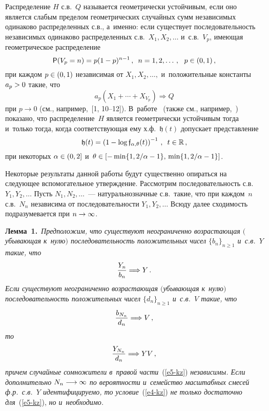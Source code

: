 \begin{multicols}{2}
Распределение $H$ с.в.~$Q$ называется геометрически устойчивым,
если оно является слабым пределом геометрических случайных сумм
независимых одинаково распределенных с.в., а~именно: если существует
последовательность независимых одинаково распределенных с.в.\
$X_1,X_2,\ldots$ и~с.в.~$V_p$, имеющая геометрическое распределение
\begin{equation*}
{\sf P}(V_p=n)=p(1-p)^{n-1}\,,\enskip n=1,2,\ldots\,,\ \  p\in(0,1)\,,
\end{equation*}
при каждом $p\hm\in(0,1)$ независимая от $X_1,X_2,\ldots,$ 
и~положительные константы~$a_p\hm>0$ такие, что
$$
a_p\left(X_1+\cdots+X_{V_p}\right)\Longrightarrow Q
$$
при $p\to 0$ (см., например,~[1, 10--12]). 
В~работе~\cite{KlebanovManiaMelamed1984} (также см., 
например,~\cite{Rachev1991, GnedenkoKorolev1996}) показано, что распределение~$H$ 
является геометрически устойчивым тогда и~только тогда, когда
соответствующая ему х.ф.~$\mathfrak{h}(t)$ допускает представление
\begin{equation}
\mathfrak{h}(t)=\left(1-\log\mathfrak{f}_{\alpha,\theta}(t)\right)^{-1}\,,\enskip
t\in\mathbb{R}\,,
\label{e3-kz}
\end{equation}
при некоторых $\alpha\hm\in(0,2]$ 
и~$\theta\hm\in[-\min\{1,{2}/{\alpha}\hm-1\},\,\min\{1,{2}/{\alpha}\hm-1\}]$.

Некоторые результаты данной работы будут существенно опираться на
следующее вспомогательное утверждение. Рассмотрим последовательность
с.в.~$Y_1, Y_2,\ldots$ Пусть $N_1,N_2,\ldots$~---
на\-ту\-раль\-но\-знач\-ные с.в.\ такие, что при каждом~$n$ с.в.~$N_n$ 
независима от последовательности $Y_1,Y_2,\ldots$ Всюду далее
сходимость подразумевается при $n\hm\to\infty$.

\smallskip

\noindent
\textbf{Лемма~1.}\ \textit{Предположим, что существуют неограниченно
возрастающая $($убывающая к~нулю$)$ последовательность положительных
чисел $\{b_n\}_{n\geqslant1}$ и~с.в.~$Y$ такие, что}
$$
\displaystyle\frac{\displaystyle Y_n\mathstrut}{\displaystyle b_n\mathstrut}\Longrightarrow Y\,.
$$
\textit{Если существуют неограниченно возрастающая $($убывающая к~нулю$)$
последовательность положительных чисел $\{d_n\}_{n\geqslant1}$ и~с.в.~$V$
такие, что}
\begin{equation}
\displaystyle\frac{\displaystyle b_{N_n}\mathstrut}{\displaystyle d_n\mathstrut}\Longrightarrow V\,,
\label{e4-kz}
\end{equation}
\textit{то}
\begin{equation}
\displaystyle\frac{\displaystyle Y_{N_n}\mathstrut}{\displaystyle d_n\mathstrut}\Longrightarrow Y V\,,\label{e5-kz}
\end{equation}
\textit{причем случайные сомножители в~правой части}~(\ref{e5-kz}) \textit{независимы. Если
дополнительно $N_n\hm\longrightarrow\infty$ по вероятности и~семейство
масштабных смесей ф.р.\ с.в.~$Y$ идентифицируемо, то условие}~(\ref{e4-kz})
 \textit{не только достаточно для}~(\ref{e5-kz}), \textit{но и~необходимо.}


\end{multicols}
